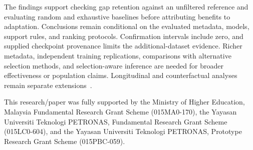 \documentclass[sigconf,nonacm]{acmart}
\begin{document}
The findings support checking gap retention against an unfiltered reference and evaluating random and exhaustive baselines before attributing benefits to adaptation. Conclusions remain conditional on the evaluated metadata, models, support rules, and ranking protocols. Confirmation intervals include zero, and supplied checkpoint provenance limits the additional-dataset evidence. Richer metadata, independent training replications, comparisons with alternative selection methods, and selection-aware inference are needed for broader effectiveness or population claims. Longitudinal and counterfactual analyses remain separate extensions~\cite{mansoury2020feedback,zoralioglu2024dynamic,li2021towards,medda2024gnnuers}.


\begin{acks}
This research/paper was fully supported by the Ministry of Higher Education, Malaysia Fundamental Research Grant Scheme (015MA0-170), the Yayasan Universiti Teknologi PETRONAS, Fundamental Research Grant Scheme (015LC0-604), and the Yayasan Universiti Teknologi PETRONAS, Prototype Research Grant Scheme (015PBC-059).
\end{acks}



\end{document}
